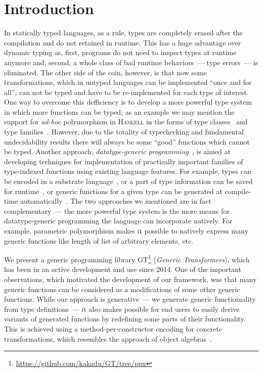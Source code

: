 \section{Introduction}

In statically typed languages, as a rule, types are completely erased after the compilation and do not retained in runtime. This has a huge advantage over
dynamic typing as, first, programs do not need to inspect types at runtime anymore and, second, a whole class of bad runtime behaviors~--- type errors~---
is eliminated. The other side of the coin, however, is that now some transformations, which in untyped languages can be implemented ``once and for all'',
can not be typed and have to be re-implemented for each type of interest. One way to overcome this defficiency is to develop a more powerful type system in
which more functions can be typed; as an example we may mention the support for \emph{ad-hoc} polymorphism in \textsc{Haskell} in the forms of type
classes~\cite{TypeClasses} and type families~\cite{TypeFamilies}. However, due to the totality of typechecking and fundamental undecidability results there
will always be some ``good'' functions which cannot be typed. Another approach, \emph{datatype-generic programming}~\cite{DGP}, is aimed at developing techniques for
implementation of practically important families of type-indexed functions using existing language features. For example, types can be encoded in a substrate
language~\cite{Hinze,InstantGenerics,GenericOCaml}, or a part of type information can be saved for runtime~\cite{SYBOCaml}, or generic functions for a given
type can be generated at compile-time automatically~\cite{Yallop,PPXDeriving}. The two approaches we mentioned are in fact complementary~--- the more powerful
type system is the more means for datatype-generic programming the language can incorporate natively. For example, parametric polymorphism makes it possible
to natively express many generic functions like length of list of arbitrary elements, etc.

We present a generic programming library \textsc{GT}\footnote{\url{https://github.com/kakadu/GT/tree/ppx}} (\emph{Generic Transformers}), which has been in an
active development and use since 2014. One of the important observations, which motivated the development of our framework, was that many generic functions
can be considered as a modifications of some other generic functions. While our approach is generative~--- we generate generic functioinality from type definitions~---
it also makes possible for end users to easily derive variants of generated functions by redefining some parts of their functionality. This is achieved using
a method-per-constructor encoding for concrete transformations, which resembles the approach of object algebras~\cite{ObjectAlgebras}.

